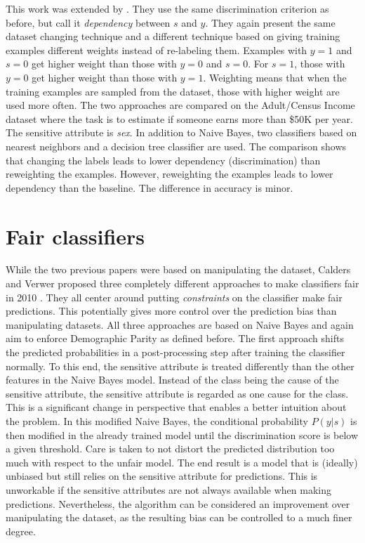 This work was extended by \citet{calders2009building}.
They use the same discrimination criterion as before,
but call it \emph{dependency} between \(s\) and \(y\).
They again present the same dataset changing technique
and a different technique based on giving training examples different weights
instead of re-labeling them.
Examples with \(y=1\) and \(s=0\) get higher weight than those with \(y=0\) and \(s=0\).
For \(s=1\), those with \(y=0\) get higher weight than those with \(y=1\).
Weighting means that when the training examples are sampled from the dataset,
those with higher weight are used more often.
The two approaches are compared on the Adult/Census Income dataset \citep{kohavi1996scaling}
where the task is to estimate if someone earns more than \$50K per year.
The sensitive attribute is \emph{sex}.
In addition to Naive Bayes,
two classifiers based on nearest neighbors and a decision tree classifier are used.
The comparison shows that changing the labels leads to lower dependency (discrimination)
than reweighting the examples.
However, reweighting the examples leads to lower dependency than the baseline.
The difference in accuracy is minor.

\section{Fair classifiers}\label{fair-classifiers}
While the two previous papers were based on manipulating the dataset,
Calders and Verwer proposed three completely different approaches
to make classifiers fair in 2010 \citep{calders2010three}.
They all center around putting \emph{constraints} on the classifier make fair predictions.
This potentially gives more control over the prediction bias than manipulating datasets.
All three approaches are based on Naive Bayes
and again aim to enforce Demographic Parity as defined before.
The first approach shifts the predicted probabilities in a post-processing step
after training the classifier normally.
To this end, the sensitive attribute is treated differently
than the other features in the Naive Bayes model.
Instead of the class being the cause of the sensitive attribute,
the sensitive attribute is regarded as one cause for the class.
This is a significant change in perspective that enables a better intuition about the problem.
In this modified Naive Bayes,
the conditional probability \(P(y|s)\) is then modified in the already trained model
until the discrimination score is below a given threshold.
Care is taken to not distort the predicted distribution too much with respect to the unfair model.
The end result is a model that is (ideally) unbiased
but still relies on the sensitive attribute for predictions.
This is unworkable if the sensitive attributes are not always available when making predictions.
Nevertheless, the algorithm can be considered an improvement over manipulating the dataset,
as the resulting bias can be controlled to a much finer degree.

